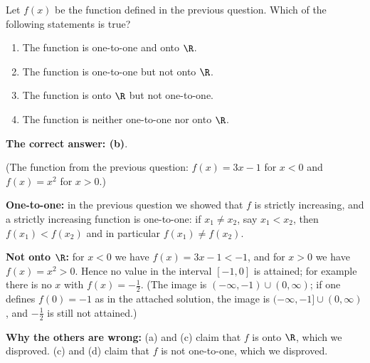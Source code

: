 
\begin{question}
Let $f(x)$ be the function defined in the previous question. Which of the following statements is true?
\begin{enumerate}
  \item The function is one-to-one and onto $\R$.
  \item The function is one-to-one but not onto $\R$.
  \item The function is onto $\R$ but not one-to-one.
  \item The function is neither one-to-one nor onto $\R$.
\end{enumerate}
\end{question}

\begin{solution}
\textbf{The correct answer: (b)}.

(The function from the previous question: $f(x)=3x-1$ for $x<0$ and $f(x)=x^2$ for $x>0$.)

\textbf{One-to-one:} in the previous question we showed that $f$ is strictly increasing, and a strictly increasing function is one-to-one: if $x_1\neq x_2$, say $x_1<x_2$, then $f(x_1)<f(x_2)$ and in particular $f(x_1)\neq f(x_2)$.

\textbf{Not onto $\R$:} for $x<0$ we have $f(x)=3x-1<-1$, and for $x>0$ we have $f(x)=x^2>0$. Hence no value in the interval $[-1,0]$ is attained; for example there is no $x$ with $f(x)=-\frac12$. (The image is $(-\infty,-1)\cup(0,\infty)$; if one defines $f(0)=-1$ as in the attached solution, the image is $(-\infty,-1]\cup(0,\infty)$, and $-\frac12$ is still not attained.)

\textbf{Why the others are wrong:} (a) and (c) claim that $f$ is onto $\R$, which we disproved. (c) and (d) claim that $f$ is not one-to-one, which we disproved.
\end{solution}
